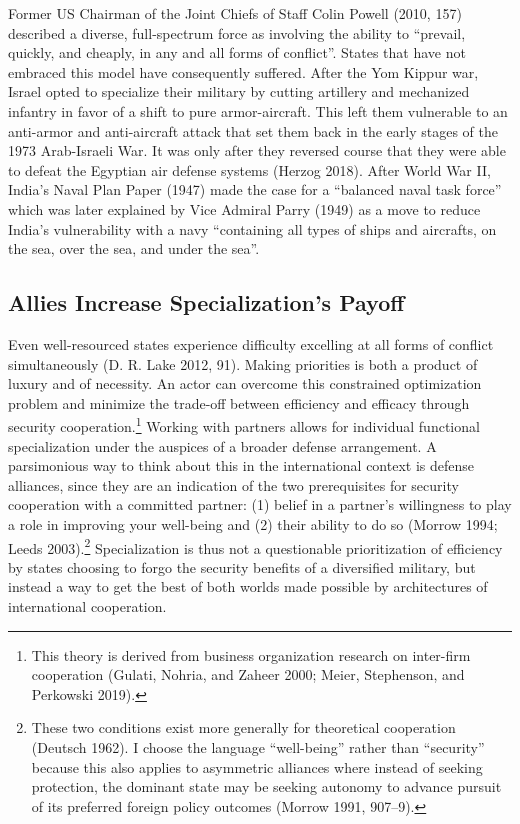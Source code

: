 \documentclass[
  12,
  letterpaper,
  DIV=11,
  numbers=noendperiod]{scrartcl}
\begin{document}
Former US Chairman of the Joint Chiefs of Staff Colin Powell (2010, 157)
described a diverse, full-spectrum force as involving the ability to
``prevail, quickly, and cheaply, in any and all forms of conflict''.
States that have not embraced this model have consequently suffered.
After the Yom Kippur war, Israel opted to specialize their military by
cutting artillery and mechanized infantry in favor of a shift to pure
armor-aircraft. This left them vulnerable to an anti-armor and
anti-aircraft attack that set them back in the early stages of the 1973
Arab-Israeli War. It was only after they reversed course that they were
able to defeat the Egyptian air defense systems (Herzog 2018). After
World War II, India's Naval Plan Paper (1947) made the case for a
``balanced naval task force'' which was later explained by Vice Admiral
Parry (1949) as a move to reduce India's vulnerability with a navy
``containing all types of ships and aircrafts, on the sea, over the sea,
and under the sea''.

\hypertarget{allies-increase-specializations-payoff}{%
\subsection{Allies Increase Specialization's
Payoff}\label{allies-increase-specializations-payoff}}

Even well-resourced states experience difficulty excelling at all forms
of conflict simultaneously (D. R. Lake 2012, 91). Making priorities is
both a product of luxury and of necessity. An actor can overcome this
constrained optimization problem and minimize the trade-off between
efficiency and efficacy through security cooperation.\footnote{This
  theory is derived from business organization research on inter-firm
  cooperation (Gulati, Nohria, and Zaheer 2000; Meier, Stephenson, and
  Perkowski 2019).} Working with partners allows for individual
functional specialization under the auspices of a broader defense
arrangement. A parsimonious way to think about this in the international
context is defense alliances, since they are an indication of the two
prerequisites for security cooperation with a committed partner: (1)
belief in a partner's willingness to play a role in improving your
well-being and (2) their ability to do so (Morrow 1994; Leeds
2003).\footnote{These two conditions exist more generally for
  theoretical cooperation (Deutsch 1962). I choose the language
  ``well-being'' rather than ``security'' because this also applies to
  asymmetric alliances where instead of seeking protection, the dominant
  state may be seeking autonomy to advance pursuit of its preferred
  foreign policy outcomes (Morrow 1991, 907--9).} Specialization is thus
not a questionable prioritization of efficiency by states choosing to
forgo the security benefits of a diversified military, but instead a way
to get the best of both worlds made possible by architectures of
international cooperation.
\end{document}
